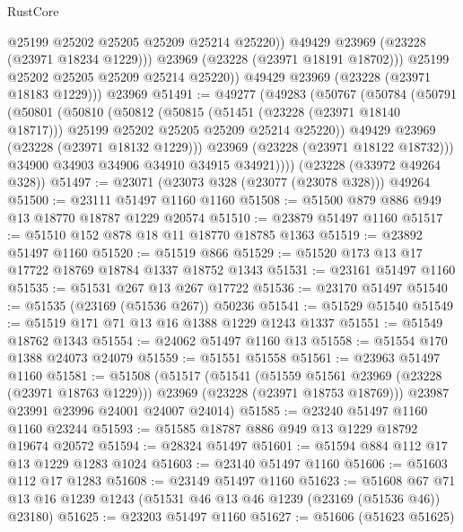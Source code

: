 \begin{lexlean}{RustCore}
\begin{coremodule}
                  @25199
                  @25202
                  @25205
                  @25209
                  @25214
                  @25220))
              @49429
              @23969
              (@23228 (@23971 @18234 @1229)))
            @23969
            (@23228 (@23971 @18191 @18702)))
          @25199
          @25202
          @25205
          @25209
          @25214
          @25220))
      @49429
      @23969
      (@23228 (@23971 @18183 @1229)))
    @23969
@51491 := @49277
    (@49283
      (@50767
        (@50784
          (@50791
            (@50801
              (@50810
                (@50812
                  (@50815
                    (@51451 (@23228 (@23971 @18140 @18717)))
                    @25199
                    @25202
                    @25205
                    @25209
                    @25214
                    @25220))
                @49429
                @23969
                (@23228 (@23971 @18132 @1229)))
              @23969
              (@23228 (@23971 @18122 @18732)))
            @34900
            @34903
            @34906
            @34910
            @34915
            @34921))))
    (@23228 (@33972 @49264 @328))
@51497 := @23071 (@23073 @328 (@23077 (@23078 @328))) @49264
@51500 := @23111 @51497 @1160 @1160
@51508 := @51500 @879 @886 @949 @13 @18770 @18787 @1229 @20574
@51510 := @23879 @51497 @1160
@51517 := @51510 @152 @878 @18 @11 @18770 @18785 @1363
@51519 := @23892 @51497 @1160
@51520 := @51519 @866
@51529 := @51520 @173 @13 @17 @17722 @18769 @18784 @1337 @18752 @1343
@51531 := @23161 @51497 @1160
@51535 := @51531 @267 @13 @267 @17722
@51536 := @23170 @51497
@51540 := @51535 (@23169 (@51536 @267)) @50236
@51541 := @51529 @51540
@51549 := @51519 @171 @71 @13 @16 @1388 @1229 @1243 @1337
@51551 := @51549 @18762 @1343
@51554 := @24062 @51497 @1160 @13
@51558 := @51554 @170 @1388 @24073 @24079
@51559 := @51551 @51558
@51561 := @23963 @51497 @1160
@51581 := @51508
    (@51517
      (@51541
        (@51559 @51561 @23969 (@23228 (@23971 @18763 @1229)))
        @23969
        (@23228 (@23971 @18753 @18769)))
      @23987
      @23991
      @23996
      @24001
      @24007
      @24014)
@51585 := @23240 @51497 @1160 @1160 @23244
@51593 := @51585 @18787 @886 @949 @13 @1229 @18792 @19674 @20572
@51594 := @28324 @51497
@51601 := @51594 @884 @112 @17 @13 @1229 @1283 @1024
@51603 := @23140 @51497 @1160
@51606 := @51603 @112 @17 @1283
@51608 := @23149 @51497 @1160
@51623 := @51608 @67 @71 @13 @16 @1239 @1243 (@51531 @46 @13 @46 @1239 (@23169 (@51536 @46)) @23180)
@51625 := @23203 @51497 @1160
@51627 := @51606 (@51623 @51625)

\end{coremodule}
\end{lexlean}
